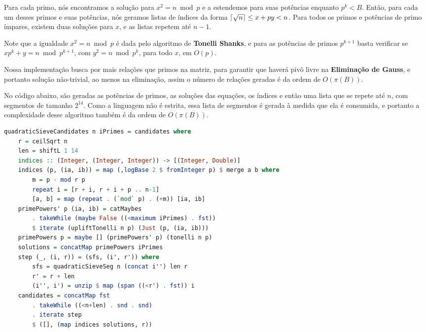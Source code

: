 \documentclass{article}
\DeclarePairedDelimiter{\ceil}{\lceil}{\rceil}
\begin{document}
Para cada primo, nós encontramos a solução para $x^2 = n \bmod p$ e a estendemos para suas potências enquanto $p^k < B$.
Então, para cada um desses primos e suas potências, nós geramos listas de índices da forma $\ceil{\sqrt{n}} \leq x + py < n$. Para todos os primos e potências de primo ímpares, existem duas soluções para $x$, e as listas repetem até $n-1$.

Note que a igualdade $x^2 = n \bmod p$ é dada pelo algoritmo de \textbf{Tonelli Shanks}, e para as potências de primos $p^{k+1}$ basta verificar se $x p^k + y = n \bmod p^{k+1}$, com $y^2 = n \bmod p^k$, para todo $x$, em $O(p)$.

Nossa implementação busca por mais relações que primos na matriz, para garantir que haverá pivô livre na \textbf{Eliminação de Gauss}, e portanto solução não-trivial, ao menos na eliminação, assim o número de relações geradas é da ordem de $O(\pi(B))$.

No código abaixo, são geradas as potências de primos, as soluções das equações, os índices e então uma lista que se repete até $n$, com segmentos de tamanho $2^{14}$. Como a linguagem não é estrita, essa lista de segmentos é gerada à medida que ela é consumida, e portanto a complexidade desse algoritmo também é da ordem de $O(\pi(B))$.

\begin{minipage}{0.9\linewidth}
\begin{lstlisting}[language=haskell,caption=Crivo Quadrático - Candidatos]
quadraticSieveCandidates n iPrimes = candidates where
    r = ceilSqrt n
    len = shiftL 1 14
    indices :: (Integer, (Integer, Integer)) -> [(Integer, Double)]
    indices (p, (ia, ib)) = map (,logBase 2 $ fromInteger p) $ merge a b where
        m = p - mod r p
        repeat i = [r + i, r + i + p .. n-1]
        [a, b] = map (repeat . (`mod` p) . (+m)) [ia, ib]
    primePowers' p (ia, ib) = catMaybes
        . takeWhile (maybe False ((<maximum iPrimes) . fst))
        $ iterate (upliftTonelli n p) (Just (p, (ia, ib)))
    primePowers p = maybe [] (primePowers' p) (tonelli n p)
    solutions = concatMap primePowers iPrimes
    step (_, (i, r)) = (sfs, (i', r')) where
        sfs = quadraticSieveSeg n (concat i'') len r
        r' = r + len
        (i'', i') = unzip $ map (span ((<r') . fst)) i
    candidates = concatMap fst
        . takeWhile ((<n+len) . snd . snd)
        . iterate step
        $ ([], (map indices solutions, r))
\end{lstlisting}
\end{minipage}
\end{document}
